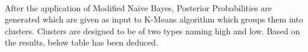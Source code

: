 \documentclass{report}
\begin{document}
\paragraph{}
After the application of Modified Naive Bayes, Posterior Probabilities are generated which are given as input to K-Means algorithm which groups them into clusters. Clusters are designed to be of two types naming high and low.
Based on the results, below table has been deduced.




\end{document}
